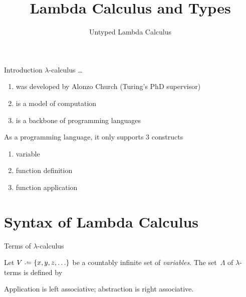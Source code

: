 \title{Lambda Calculus and Types}
\subtitle{Untyped Lambda Calculus}

\begin{frame}
\maketitle
\end{frame}

\begin{frame}{Introduction}
  $\lambda$-calculus \dots
  \begin{enumerate}
    \item was developed by Alonzo Church (Turing's PhD supervisor)
    \item is a model of computation
    \item is a backbone of programming languages
  \end{enumerate}
  As a programming language, it only supports $3$ constructs 
  \begin{enumerate}
    \item variable
    \item function definition
    \item function application
  \end{enumerate}
\end{frame}

\section{Syntax of Lambda Calculus}

\begin{frame}{Terms of $\lambda$-calculus}
\begin{definition}
  Let $V \defeq \{ x, y, z, \ldots \}$ be a countably infinite set of
  \emph{variables}. The set~$\Lambda$ of \alert{$\lambda$-terms} is defined
  by
    \begin{prooftree}
    \end{prooftree}
    \begin{prooftree}
    \end{prooftree}
    \begin{prooftree}
    \end{prooftree}
\end{definition}
\noindent Application is left associative; abstraction is right associative. 
\end{frame}


